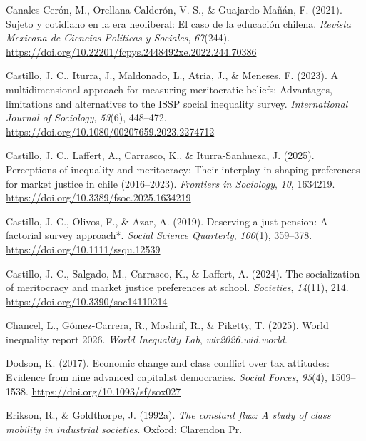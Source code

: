 \documentclass[
  12pt,
]{article}
\newlength{\cslhangindent}
\newenvironment{CSLReferences}[2] %
 {\begin{list}{}{%
  \setlength{\itemindent}{0pt}
  \setlength{\leftmargin}{0pt}
  \setlength{\parsep}{0pt}
  \ifodd #1
   \setlength{\leftmargin}{\cslhangindent}
   \setlength{\itemindent}{-1\cslhangindent}
  \fi
  \setlength{\itemsep}{#2\baselineskip}}}
 {\end{list}}
\begin{document}
\begin{CSLReferences}{1}{0}
Canales Cerón, M., Orellana Calderón, V. S., \& Guajardo Mañán, F.
(2021). Sujeto y cotidiano en la era neoliberal: El caso de la educación
chilena. \emph{Revista Mexicana de Ciencias Políticas y Sociales},
\emph{67}(244).
\url{https://doi.org/10.22201/fcpys.2448492xe.2022.244.70386}

Castillo, J. C., Iturra, J., Maldonado, L., Atria, J., \& Meneses, F.
(2023). A multidimensional approach for measuring meritocratic beliefs:
Advantages, limitations and alternatives to the ISSP social inequality
survey. \emph{International Journal of Sociology}, \emph{53}(6),
448--472. \url{https://doi.org/10.1080/00207659.2023.2274712}

Castillo, J. C., Laffert, A., Carrasco, K., \& Iturra-Sanhueza, J.
(2025). Perceptions of inequality and meritocracy: Their interplay in
shaping preferences for market justice in chile (2016--2023).
\emph{Frontiers in Sociology}, \emph{10}, 1634219.
\url{https://doi.org/10.3389/fsoc.2025.1634219}

Castillo, J. C., Olivos, F., \& Azar, A. (2019). Deserving a just
pension: A factorial survey approach*. \emph{Social Science Quarterly},
\emph{100}(1), 359--378. \url{https://doi.org/10.1111/ssqu.12539}

Castillo, J. C., Salgado, M., Carrasco, K., \& Laffert, A. (2024). The
socialization of meritocracy and market justice preferences at school.
\emph{Societies}, \emph{14}(11), 214.
\url{https://doi.org/10.3390/soc14110214}

Chancel, L., Gómez-Carrera, R., Moshrif, R., \& Piketty, T. (2025).
World inequality report 2026. \emph{World Inequality Lab},
\emph{wir2026.wid.world}.

Dodson, K. (2017). Economic change and class conflict over tax
attitudes: Evidence from nine advanced capitalist democracies.
\emph{Social Forces}, \emph{95}(4), 1509--1538.
\url{https://doi.org/10.1093/sf/sox027}

Erikson, R., \& Goldthorpe, J. (1992a). \emph{The constant flux: A study
of class mobility in industrial societies}. Oxford: Clarendon Pr.


\end{CSLReferences}
\end{document}
